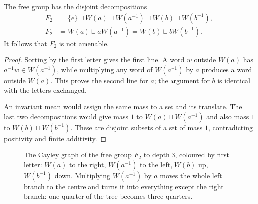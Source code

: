 \begin{proposition}\label{prop:f2paradox}
The free group has the disjoint decompositions
\[\begin{aligned}
F_2&=\{e\}\sqcup W(a)\sqcup W(a^{-1})\sqcup W(b)\sqcup W(b^{-1}),\\
F_2&=W(a)\sqcup aW(a^{-1})=W(b)\sqcup bW(b^{-1}).
\end{aligned}\]
It follows that $F_2$ is not amenable.
\end{proposition}
\begin{proof}
Sorting by the first letter gives the first line. A word $w$ outside $W(a)$ has $a^{-1}w\in W(a^{-1})$, while multiplying any word of $W(a^{-1})$ by $a$ produces a word outside $W(a)$. This proves the second line for $a$; the argument for $b$ is identical with the letters exchanged.

An invariant mean would assign the same mass to a set and its translate. The last two decompositions would give mass $1$ to $W(a)\sqcup W(a^{-1})$ and also mass $1$ to $W(b)\sqcup W(b^{-1})$. These are disjoint subsets of a set of mass $1$, contradicting positivity and finite additivity.
\end{proof}
\begin{figure}[ht]
\centering
{}
\caption{The Cayley graph of the free group $F_2$ to depth $3$, coloured by first letter: $W(a)$ to the right, $W(a^{-1})$ to the left, $W(b)$ up, $W(b^{-1})$ down.
Multiplying $W(a^{-1})$ by $a$ moves the whole left branch to the centre and turns it into everything except the right branch: one quarter of the tree becomes
three quarters.}
\label{fig:freegroup}
\end{figure}

